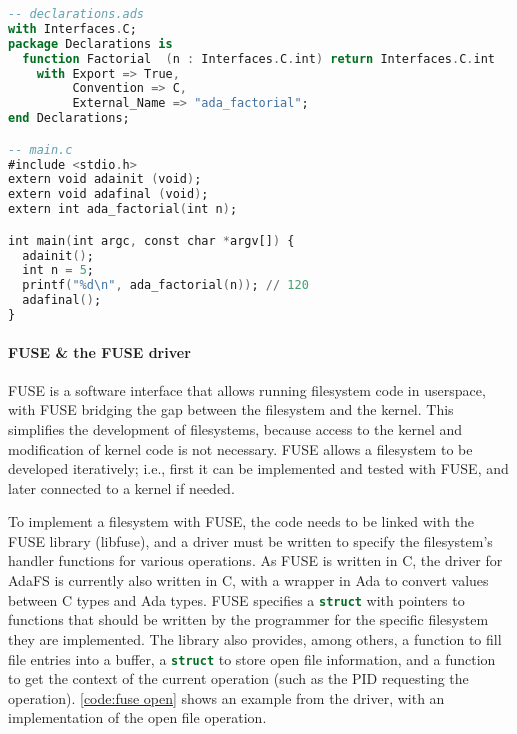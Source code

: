 \begin{lstlisting}[caption={Interfacing code written in C and Ada. \textnormal{declarations.adb} is omitted for brevity, but is assumed to contain an implementation of the factorial function conforming to the specification.}, label={code:interfacing c and ada}, language=Ada, alsolanguage=C]
-- declarations.ads
with Interfaces.C;
package Declarations is
  function Factorial  (n : Interfaces.C.int) return Interfaces.C.int
    with Export => True,
         Convention => C,
         External_Name => "ada_factorial";
end Declarations;

-- main.c
#include <stdio.h>
extern void adainit (void);
extern void adafinal (void);
extern int ada_factorial(int n);

int main(int argc, const char *argv[]) {
  adainit();
  int n = 5;
  printf("%d\n", ada_factorial(n)); // 120
  adafinal();
}
\end{lstlisting}

\paragraph{FUSE \& the FUSE driver}
FUSE is a software interface that allows running filesystem code in userspace, with FUSE bridging the gap between the filesystem and the kernel.
This simplifies the development of filesystems, because access to the kernel and modification of kernel code is not necessary.
FUSE allows a filesystem to be developed iteratively; i.e., first it can be implemented and tested with FUSE, and later connected to a kernel if needed.

To implement a filesystem with FUSE, the code needs to be linked with the FUSE library (libfuse), and a driver must be written to specify the filesystem's handler functions for various operations.
As FUSE is written in C, the driver for AdaFS is currently also written in C, with a wrapper in Ada to convert values between C types and Ada types.
FUSE specifies a \lstinline[language=C]{struct} with pointers to functions that should be written by the programmer for the specific filesystem they are implemented.
The library also provides, among others, a function to fill file entries into a buffer, a \lstinline[language=C]{struct} to store open file information, and a function to get the context of the current operation (such as the PID requesting the operation).
\autoref{code:fuse open} shows an example from the driver, with an implementation of the open file operation.

